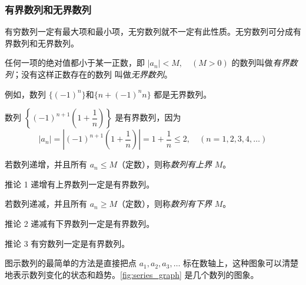 \subsubsection{有界数列和无界数列}
有穷数列一定有最大项和最小项，无穷数列就不一定有此性质。无穷数列可分成有界数列和无界数列。

\begin{Definition}
任何一项的绝对值都小于某一正数，即 $|a_n|<M,\quad (M>0)$ 的数列叫做\emph{有界数列}；没有这样正数存在的数列
叫做\emph{无界数列}。    
\end{Definition}
 
例如，数列 $\{(-1)^n\}$和$\{n+(-1)^n n\}$ 都是无界数列。

数列 $\left\{(-1)^{n+1}\left(1+\dfrac{1}{n}\right)\right\}$ 是有界数列，因为
\[|a_n|=\left|(-1)^{n+1}\left(1+\frac{1}{n}\right)\right|=1+\frac{1}{n}\leqslant 2,\quad (n=1,
2,3,4,\ldots)\]

若数列递增，并且所有 $a_n\leqslant M$（定数），则称\emph{数列有上界} $M$。

\begin{Deduction}{推论 1}
  递增有上界数列一定是有界数列。
\end{Deduction}

若数列递减，并且所有 $a_n\geqslant M$（定数），则称\emph{数列有下界} $M$。

\begin{Deduction}{推论 2}
  递减有下界数列一定是有界数列。
\end{Deduction}

\begin{Deduction}{推论 3}
  有穷数列一定是有界数列。
\end{Deduction}

图示数列的最简单的方法是直接把点 $a_1,a_2,a_3,\ldots$ 标在数轴上，这种图象可以清楚地表示数列变化的状态和趋势。\cref{fig:series_graph} 是几个数列的图象。

